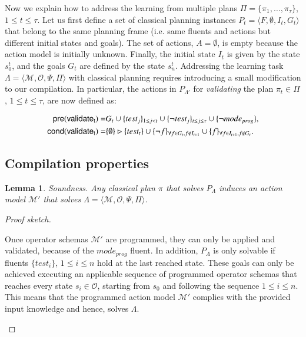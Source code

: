 \documentclass[3p,times]{elsarticle}
\newtheorem{mylemma}[mytheorem]{Lemma}
\newcommand{\pre}{\mathsf{pre}}  %
\newcommand{\cond}{\mathsf{cond}}   %
\newcommand{\tup}[1]{{\langle #1 \rangle}}
\begin{document}
Now we explain how to address the learning from multiple plans $\Pi=\{\pi_1,\ldots,\pi_{\tau}\}$, {\tt\small $1\leq t\leq \tau$}. Let us first define a set of classical planning instances $P_t=\tup{F,\emptyset,I_t,G_t}$ that belong to the same planning frame (i.e. same fluents and actions but different initial states and goals). The set of actions, $A=\emptyset$, is empty because the action model is initially unknown. Finally, the initial state $I_t$ is given by the state $s_0^t$, and the goals $G_t$ are defined by the state $s_n^t$. Addressing the learning task $\Lambda=\tup{\mathcal{M},\mathcal{O},\Psi,\Pi}$ with classical planning requires introducing a small modification to our compilation. In particular, the actions in $P_{\Lambda'}$ for {\em validating} the plan $\pi_t\in\Pi$, {\tt\small $1\leq t\leq \tau$}, are now defined as:
\begin{small}
\begin{align*}
\hspace*{7pt}\pre(\mathsf{validate_{t}})=&G_t\cup\{test_j\}_{1\leq j<t}\cup\{\neg test_j\}_{t\leq j\leq \tau}\cup \{\neg mode_{prog}\},\\
\cond(\mathsf{validate_{t}})=&\{\emptyset\}\rhd\{test_t\} \cup \{\neg f\}_{\forall f\in G_t, f \notin I_{t+1}}\cup \{f\}_{\forall f\in I_{t+1}, f \notin G_t}.
\end{align*}
\end{small}



\subsection{Compilation properties}

\begin{mylemma}
Soundness. Any classical plan $\pi$ that solves $P_{\Lambda}$ induces an action model $\mathcal{M}'$ that solves $\Lambda=\tup{\mathcal{M},\mathcal{O},\Psi,\Pi}$.
\end{mylemma}

\begin{proof}[Proof sketch]
\begin{small}
Once operator schemas $\mathcal{M}'$ are programmed, they can only be applied and validated, because of the $mode_{prog}$ fluent. In addition, $P_{\Lambda}$ is only solvable if fluents $\{test_i\}$, {\small $1\leq i\leq n$} hold at the last reached state. These goals can only be achieved executing an applicable sequence of programmed operator schemas that reaches every state $s_i\in\mathcal{O}$, starting from $s_0$ and following the sequence {\small $1\leq i\leq n$}. This means that the programmed action model $\mathcal{M}'$ complies with the provided input knowledge and hence, solves $\Lambda$.
\end{small}
\end{proof}
\end{document}
